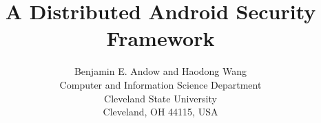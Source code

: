 \documentclass[10pt,conference]{IEEEtran}
\begin{document}
\title{A Distributed Android Security Framework}
\author{
    Benjamin E. Andow and Haodong Wang\\
    Computer and Information Science Department\\
    Cleveland State University\\
    Cleveland, OH 44115, USA
}


\maketitle


%







\end{document}
